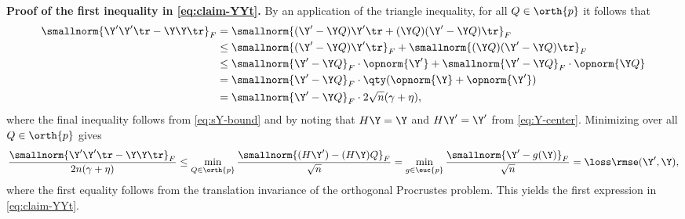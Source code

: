\documentclass[10pt]{article}
\begin{document}
\textbf{Proof of the first inequality in \cref{eq:claim-YYt}.} By an application of the triangle inequality, for all $Q \in \orth{p}$ it follows that
\begin{align}
    \smallnorm{\Y'\Y'{}\tr - \Y\Y\tr}_F 
    &= \smallnorm{(\Y' - \Y Q)\Y'{}\tr + (\Y Q)(\Y' - \Y Q)\tr}_F\\
    &\le \smallnorm{(\Y' - \Y Q)\Y'{}\tr}_F + \smallnorm{(\Y Q)(\Y' - \Y Q)\tr}_F\\
    &\le \smallnorm{\Y' - \Y Q}_F \cdot \opnorm{\Y'} + \smallnorm{\Y' - \Y Q}_F\cdot \opnorm{\Y Q}\\
    &= \smallnorm{\Y' - \Y Q}_F \cdot \qty(\opnorm{\Y} + \opnorm{\Y'})\\
    &= \smallnorm{\Y' - \Y Q}_F \cdot 2 \sqrt{n}(\gamma + \eta),
\end{align}
where the final inequality follows from \ref{eq:sY-bound} and by noting that $H\Y = \Y$ and $H\Y' = \Y'$ from \cref{eq:Y-center}. Minimizing over all $Q \in \orth{p}$ gives
\begin{align}
    \frac{\smallnorm{\Y'\Y'{}\tr - \Y\Y\tr}_F}{2n(\gamma + \eta)}
    \le \min_{Q \in \orth{p}}\frac{\smallnorm{(H\Y') - (H\Y) Q}_F}{\sqrt{n}}
    =\min_{g \in \euc{p}}\frac{\smallnorm{\Y' - g(\Y)}_F}{\sqrt{n}} 
    = \loss\rmse(\Y', \Y),
\end{align}
where the first equality follows from the translation invariance of the orthogonal Procrustes problem. This yields the first expression in \cref{eq:claim-YYt}.
\end{document}
